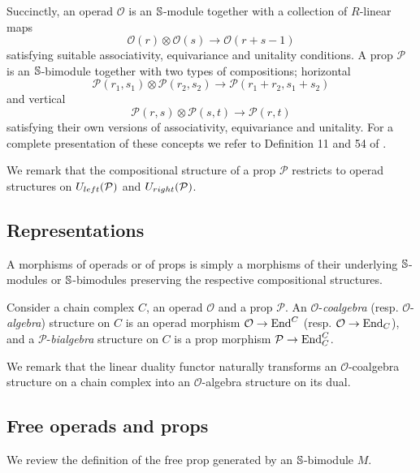Succinctly, an operad $\mathcal O$ is an $\S$-module together with a collection of $R$-linear maps
\begin{equation*}
\mathcal O(r) \otimes \mathcal O(s) \to \mathcal O(r+s-1)
\end{equation*}
satisfying suitable associativity, equivariance and unitality conditions.
A prop $\mathcal P$ is an $\S$-bimodule together with two types of compositions; horizontal
\begin{equation*}
\mathcal P(r_1, s_1) \otimes \mathcal P(r_2, s_2) \to \mathcal P(r_1 + r_2, s_1 + s_2)
\end{equation*}
and vertical
\begin{equation*}
\mathcal P(r,s) \otimes \mathcal P(s, t) \to \mathcal P(r, t)
\end{equation*}
satisfying their own versions of associativity, equivariance and unitality.
For a complete presentation of these concepts we refer to Definition 11 and 54 of \cite{Markl08}.

We remark that the compositional structure of a prop $\mathcal P$ restricts to operad structures on $\Uleft(\mathcal P)$ and $\Uright(\mathcal P)$.

\subsection{Representations}

A morphisms of operads or of props is simply a morphisms of their underlying $\S$-modules or $\S$-bimodules preserving the respective compositional structures.

Consider a chain complex $C$, an operad $\mathcal O$ and a prop $\mathcal P$. An $\mathcal O$-\textit{coalgebra} (resp. $\mathcal O$-\textit{algebra}) structure on $C$ is an operad morphism $\mathcal O \to \End^C$ (resp. $\mathcal O \to \End_C$), and a $\mathcal P$-\textit{bialgebra} structure on $C$ is a prop morphism $\mathcal P \to \End_C^C$.

We remark that the linear duality functor naturally transforms an $\mathcal O$-coalgebra structure on a chain complex into an $\mathcal O$-algebra structure on its dual.

\subsection{Free operads and props}
\label{ss:free props}

We review the definition of the free prop generated by an $\S$-bimodule $M$.

